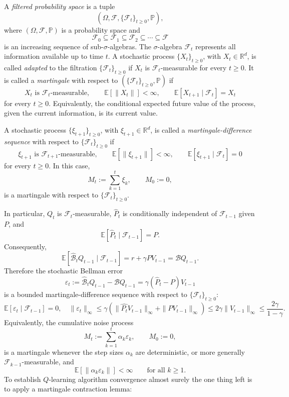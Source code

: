 \documentclass{article}
\numberwithin{equation}{section}
\newcommand{\E}{\mathbb E}
\newcommand{\norm}[1]{\|#1\|}
\newcommand{\R}{\mathbb{R}}
\newcommand{\cF}{\mathcal{F}}
\begin{document}
A \emph{filtered probability space} is a tuple
\[
    (\Omega,\cF,\{\cF_t\}_{t\ge0},\mathbb{P}),
\]
where \((\Omega,\cF,\mathbb{P})\) is a probability space and
\[
    \cF_0\subseteq \cF_1\subseteq \cF_2\subseteq \cdots \subseteq \cF
\]
is an increasing sequence of sub-\(\sigma\)-algebras. The \(\sigma\)-algebra \(\cF_t\) represents all information available up to time \(t\).
A stochastic process \(\{X_t\}_{t\ge0}\), with \(X_t\in\R^d\), is called \emph{adapted} to the filtration \(\{\cF_t\}_{t\ge0}\) if \(X_t\) is \(\cF_t\)-measurable for every \(t\ge0\). It is called a \emph{martingale} with respect to \((\{\cF_t\}_{t\ge0},\mathbb{P})\) if
\[
    X_t \text{ is } \cF_t\text{-measurable},
    \qquad
    \E[\norm{X_t}]<\infty,
    \qquad
    \E[X_{t+1}\mid\cF_t]=X_t
\]
for every \(t\ge0\). Equivalently, the conditional expected future value of the process, given the current information, is its current value.

A stochastic process \(\{\xi_{t+1}\}_{t\ge0}\), with \(\xi_{t+1}\in\R^d\), is called a \emph{martingale-difference sequence} with respect to \(\{\cF_t\}_{t\ge0}\) if
\[
    \xi_{t+1} \text{ is } \cF_{t+1}\text{-measurable},
    \qquad
    \E[\norm{\xi_{t+1}}]<\infty,
    \qquad
    \E[\xi_{t+1}\mid\cF_t]=0
\]
for every \(t\ge0\). In this case,
\[
    M_t:=\sum_{k=1}^{t}\xi_k,
    \qquad
    M_0:=0,
\]
is a martingale with respect to \(\{\cF_t\}_{t\ge0}\).

In particular, $Q_t$ is $\cF_t$-measurable, $\widehat P_{t}$ is conditionally independent of $\cF_{t - 1}$ given $P$, and
\[
    \E[\widehat P_{t}\mid\cF_{t - 1}]=P.
\]
Consequently,
\[
    \E[\widehat{\mathcal{B}}_{t}Q_{t - 1}\mid\cF_{t - 1}]
    =
    r+\gamma P V_{t - 1}
    =
    \mathcal{B}Q_{t - 1}.
\]
Therefore the stochastic Bellman error
\[
    \varepsilon_{t}
    :=
    \widehat{\mathcal{B}}_{t}Q_{t - 1}-\mathcal{B}Q_{t - 1}
    =
    \gamma(\widehat P_{t}-P)V_{t - 1}
\]
is a bounded martingale-difference sequence with respect to \(\{\cF_t\}_{t\ge0}\):
\[
    \E[\varepsilon_{t}\mid\cF_{t - 1}]=0,\quad \|\varepsilon_t\|_{\infty}\leq\gamma\left(\|\widehat{P_t}V_{t - 1}\|_{\infty} + \|PV_{t - 1}\|_{\infty}\right)\leq 2\gamma\|V_{t - 1}\|_{\infty}\leq\frac{2\gamma}{1 - \gamma}.
\]
Equivalently, the cumulative noise process
\[
    M_t:=\sum_{k=1}^{t}\alpha_k\varepsilon_k,
    \qquad
    M_0:=0,
\]
is a martingale whenever the step sizes \(\alpha_k\) are deterministic, or more generally \(\cF_{k-1}\)-measurable, and
\[
    \E[\norm{\alpha_k\varepsilon_k}]<\infty
    \qquad
    \text{for all }k\ge1.
\]
To establish $Q$-learning algorithm convergence almost surely the one thing left is to apply a martingale contraction lemma:
\end{document}

